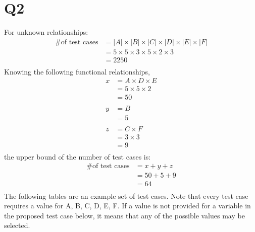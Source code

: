 \documentclass[12pt, letterpaper, titlepage]{article}
\begin{document}
\section{Q2}
For unknown relationships:
\begin{align}
    \text{\# of test cases} &= |A| \times |B| \times |C| \times |D| \times |E| \times |F| \\
    &= 5 \times 5 \times 3 \times 5 \times 2 \times 3 \\
    &= 2250 \\
\end{align}
Knowing the following functional relationships,
\begin{align}
    x &=  A \times D \times E \\
      &= 5 \times 5 \times 2 \\
      &= 50 \\\\
    y &= B \\
    &= 5 \\\\
    z &= C \times F \\
    &= 3 \times 3 \\
    &= 9\\
\end{align}
the upper bound of the number of test cases is:
\begin{align}
    \text{\# of test cases} &= x + y + z \\
    &= 50 + 5 + 9 \\
    &= 64 \\
\end{align}
The following tables are an example set of test cases. Note that every test case requires a value for A, B, C, D, E, F. If a value is not provided for a variable in the proposed test case below, it means that any of the possible values may be selected.
\end{document}
